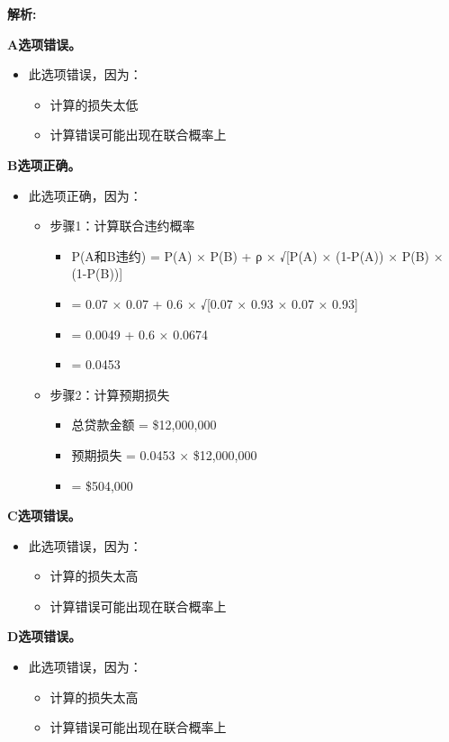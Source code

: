 \documentclass{article}
\newenvironment{explanation}
{\textbf{解析:}\par}
{\par}
\begin{document}
\begin{explanation}
    \textbf{A选项错误。}
    \begin{itemize}
        \item 此选项错误，因为：
        \begin{itemize}
            \item 计算的损失太低
            \item 计算错误可能出现在联合概率上
        \end{itemize}
    \end{itemize}
    \textbf{B选项正确。}
    \begin{itemize}
        \item 此选项正确，因为：
        \begin{itemize}
            \item 步骤1：计算联合违约概率
            \begin{itemize}
                \item P(A和B违约) = P(A) × P(B) + ρ × √[P(A) × (1-P(A)) × P(B) × (1-P(B))]
                \item = 0.07 × 0.07 + 0.6 × √[0.07 × 0.93 × 0.07 × 0.93]
                \item = 0.0049 + 0.6 × 0.0674
                \item = 0.0453
            \end{itemize}
            \item 步骤2：计算预期损失
            \begin{itemize}
                \item 总贷款金额 = \$12,000,000
                \item 预期损失 = 0.0453 × \$12,000,000
                \item = \$504,000
            \end{itemize}
        \end{itemize}
    \end{itemize}
    \textbf{C选项错误。}
    \begin{itemize}
        \item 此选项错误，因为：
        \begin{itemize}
            \item 计算的损失太高
            \item 计算错误可能出现在联合概率上
        \end{itemize}
    \end{itemize}
    \textbf{D选项错误。}
    \begin{itemize}
        \item 此选项错误，因为：
        \begin{itemize}
            \item 计算的损失太高
            \item 计算错误可能出现在联合概率上
        \end{itemize}
    \end{itemize}
\end{explanation}
\end{document}
